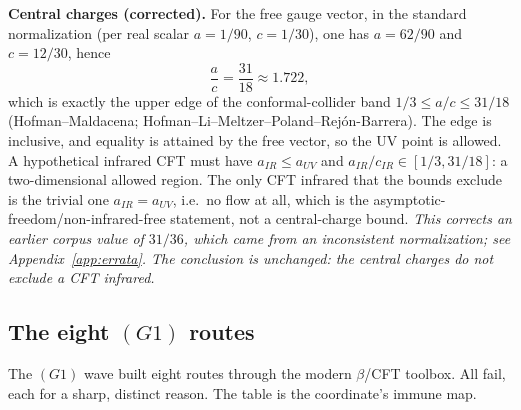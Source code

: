 \textbf{Central charges (corrected).} For the free gauge vector, in the standard normalization
(per real scalar $a=1/90$, $c=1/30$), one has $a=62/90$ and $c=12/30$, hence
\begin{equation}
\frac{a}{c}=\frac{31}{18}\approx1.722 ,
\label{eq:ac}
\end{equation}
which is exactly the upper edge of the conformal-collider band $1/3\le a/c\le31/18$
(Hofman--Maldacena; Hofman--Li--Meltzer--Poland--Rej\'on-Barrera). The edge is inclusive, and
equality is attained by the free vector, so the UV point is allowed. A hypothetical infrared CFT
must have $a_{IR}\le a_{UV}$ and $a_{IR}/c_{IR}\in[1/3,31/18]$: a two-dimensional allowed
region. The only CFT infrared that the bounds exclude is the trivial one $a_{IR}=a_{UV}$, i.e.\
no flow at all, which is the asymptotic-freedom/non-infrared-free statement, not a
central-charge bound. \emph{This corrects an earlier corpus value of $31/36$, which came from an
inconsistent normalization; see Appendix~\ref{app:errata}. The conclusion is unchanged: the
central charges do not exclude a CFT infrared.}

\subsection{The eight $(G1)$ routes}

The $(G1)$ wave built eight routes through the modern $\beta$/CFT toolbox. All fail, each for a
sharp, distinct reason. The table is the coordinate's immune map.

